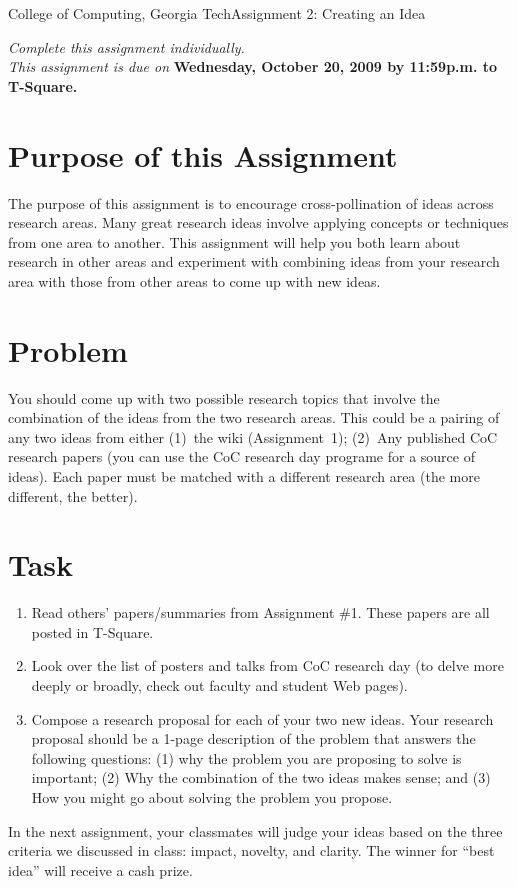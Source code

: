 \documentclass[11pt]{article}
\begin{document}


{College of Computing, Georgia Tech}{Assignment 2: Creating an Idea}

{\em Complete this assignment individually. \\  This
  assignment is due on} {\bf Wednesday, October 20, 2009 by 11:59p.m. to
  T-Square.}

\section{Purpose of this Assignment}
The purpose of this assignment is to encourage cross-pollination of
ideas across research areas.  Many great research ideas involve applying
concepts or techniques from one area to another. This assignment will
help you both learn about research in other areas and experiment with
combining ideas from your research area with those from other areas to
come up with new ideas.

\section{Problem}

You should come up with two possible research topics that involve the
combination of the ideas from the two research areas.  This could be a
pairing of any two ideas from either (1)~the wiki (Assignment~1);
(2)~Any published CoC research papers (you can use the CoC research day
programe for a source of ideas).  Each paper must be matched with a
different research area (the more different, the better).



\section{Task}

\begin{enumerate}
\itemsep=-1pt
\item Read others' papers/summaries from Assignment \#1. These papers
  are all posted in T-Square.
%
\item Look over the list of posters and talks from CoC research day (to
  delve more deeply or broadly, check out faculty and student Web pages).
%
\item Compose a research proposal for each of your two new ideas. Your
  research proposal should be a 1-page description of the problem that
  answers the following questions: (1) why the problem you are proposing
  to solve is important; (2) Why the combination of the two ideas makes
  sense; and (3) How you might go about solving the problem you propose.
\end{enumerate}
\noindent
In the next assignment, your classmates will judge your ideas based on
the three criteria we discussed in class: impact, novelty, and clarity.  The
winner for ``best idea'' will receive a cash prize.
\end{document}
